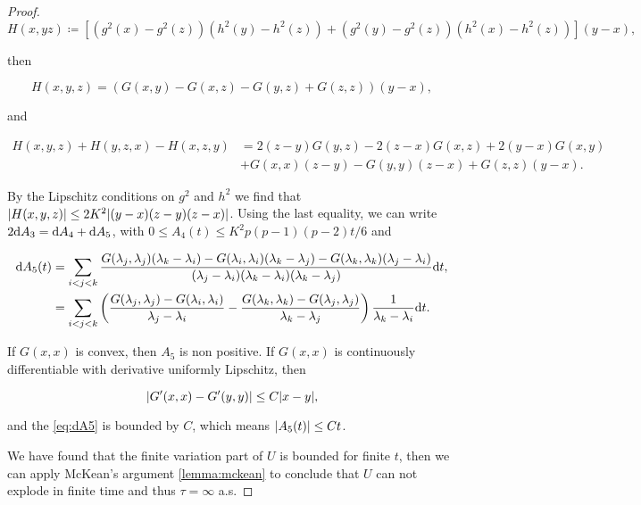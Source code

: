 \begin{proof}
    \begin{equation*}
        H(x,yz) \coloneqq \left[ (g^2(x) - g^2(z))(h^2(y) - h^2(z)) + (g^2(y) - g^2(z))(h^2(x) - h^2(z))\right](y-x),
    \end{equation*}

    \noindent then

    \begin{equation*}
        H(x,y,z) = \left( G(x,y) - G(x,z) - G(y,z) + G(z,z)\right)(y-x),
    \end{equation*}

    \noindent and

    \begin{align*}
        H(x,y,z) + H(y,z,x) - H(x,z,y) &= 2(z-y)G(y,z) - 2(z-x)G(x,z) + 2(y-x)G(x,y)\\
         &+ G(x,x)(z-y) - G(y,y)(z-x) + G(z,z)(y-x).
    \end{align*}

    By the Lipschitz conditions on $g^2$ and $h^2$ we find that $\lvert H(x,y,z) \rvert \le 2K^2\lvert (y-x)(z-y)(z-x) \rvert$. Using the last equality,  we can write $2\mathrm d A_3 = \mathrm d A_4 + \mathrm d A_5$, with $0 \le A_4(t) \le K^2 p(p-1)(p-2)t/6$ and

    \begin{align}%
        \d A_5(t) &= \sum_{i<j<k} \frac{ G(\lambda_j,\lambda_j)(\lambda_k - \lambda_i) - G(\lambda_i,\lambda_i)(\lambda_k - \lambda_j) - G(\lambda_k,\lambda_k)(\lambda_j-\lambda_i)}{(\lambda_j-\lambda_i)(\lambda_k-\lambda_i)(\lambda_k-\lambda_j)}\d t,\\
        &= \sum_{i<j<k} \left( \frac{G(\lambda_j,\lambda_j) - G(\lambda_i,\lambda_i) }{\lambda_j - \lambda_i} - \frac{G(\lambda_k,\lambda_k) - G(\lambda_j,\lambda_j)}{\lambda_k - \lambda_j} \right)\frac{1}{\lambda_k - \lambda_i}\d t. \label{eq:dA5}
    \end{align}

    If $G(x,x)$ is convex, then $A_5$ is non positive. If $G(x,x)$ is continuously differentiable with derivative uniformly Lipschitz, then

    \[ \lvert G'(x,x) - G'(y,y) \rvert \le C\lvert x-y \rvert, \]

    \noindent and the \eqref{eq:dA5} is bounded by $C$, which means $\lvert A_5(t) \rvert\le Ct$.

    We have found that the finite variation part of $U$ is bounded for finite $t$, then we can apply McKean's argument \ref{lemma:mckean} to conclude that $U$ can not explode in finite time and thus $\tau = \infty$ a.s.

\end{proof}






